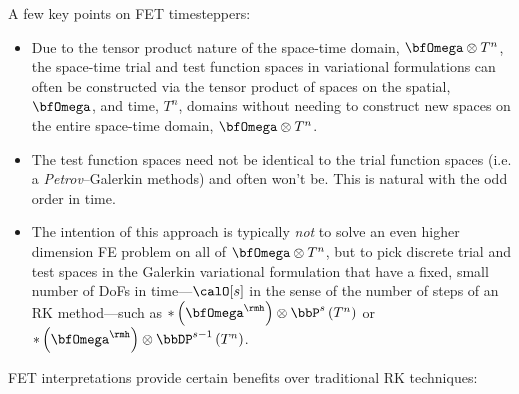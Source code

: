     A few key points on FET timesteppers:
    \begin{itemize}
        \item  Due to the tensor product nature of the space-time domain, $\bfOmega\otimes T^{n}$, the space-time trial and test function spaces in variational formulations can often be constructed via the tensor product of spaces on the spatial, $\bfOmega$, and time, $T^{n}$, domains without needing to construct new spaces on the entire space-time domain, $\bfOmega\otimes T^{n}$.
        \item  The test function spaces need not be identical to the trial function spaces (i.e. a \emph{Petrov}--Galerkin methods) and often won't be. This is natural with the odd order in time.
        \item  The intention of this approach is typically \emph{not} to solve an even higher dimension FE problem on all of $\bfOmega\otimes T^{n}$, but to pick discrete trial and test spaces in the Galerkin variational formulation that have a fixed, small number of DoFs in time---$\calO[s]$ in the sense of the number of steps of an RK method---such as $*\left(\bfOmega^{\rmh}\right)\otimes\bbP^{s}\left(T^{n}\right)$ or $*\left(\bfOmega^{\rmh}\right)\otimes\bbDP^{s - 1}\left(T^{n}\right)$.
    \end{itemize}
    FET interpretations provide certain benefits over traditional RK techniques:
